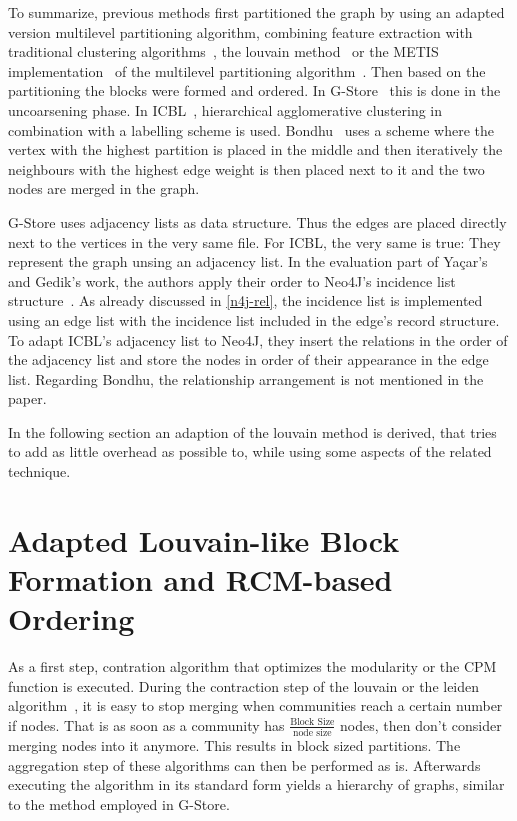      To summarize, previous methods first partitioned the graph by using an adapted version multilevel partitioning algorithm, combining feature extraction with traditional clustering algorithms~\autocite{overview_clust}, the louvain method~\autocite{blondel2008fast} or the METIS implementation~\autocite{karypis} of the multilevel partitioning algorithm~\autocite{hendrickson1995multi}.
    Then based on the partitioning the blocks were formed and ordered.
    In G-Store~\autocite{steinhaus2010g} this is done in the uncoarsening phase.
    In ICBL~\autocite{yacsar2017distributed, yacsar2015scalable}, hierarchical agglomerative clustering in combination with a labelling scheme is used.
    Bondhu~\autocite{hoque2012disk} uses a scheme where the vertex with the highest partition is placed in the middle and then iteratively the neighbours with the highest edge weight is then placed next to it and the two nodes are merged in the graph. 
    
    G-Store uses adjacency lists as data structure.
    Thus the edges are placed directly next to the vertices in the very same file.
    For ICBL, the very same is true:
    They represent the graph unsing an adjacency list. 
    In the evaluation part of Ya\c{c}ar's and Gedik's work, the authors apply their order to Neo4J's incidence list structure~\autocite{Rodriguez2010ConstructionsFD, robinson2015graph}. 
    As already discussed in \ref{n4j-rel}, the incidence list is implemented using an edge list with the incidence list included in the edge's record structure.
    To adapt ICBL's adjacency list to Neo4J, they insert the relations in the order of the adjacency list and store the nodes in order of their appearance in the edge list.    
    Regarding Bondhu, the relationship arrangement is not mentioned in the paper.
    
    In the following section an adaption of the louvain method is derived, that tries to add as little overhead as possible to, while using some aspects of the related technique.
    
\section{Adapted Louvain-like Block Formation and RCM-based Ordering}
        As a first step, contration algorithm that optimizes the modularity or the CPM~\autocite{traag2011narrow, potts1952some} function is executed.
        During the contraction step of the louvain or the leiden algorithm~\autocite{traag2019louvain}, it is easy to stop merging when communities reach a certain number if nodes.
        That is as soon as a community has $\frac{\text{Block Size}}{\text{node size}}$ nodes, then don't consider merging nodes into it anymore.
        This results in block sized partitions.
        The aggregation step of these algorithms can then be performed as is. 
        Afterwards executing the algorithm in its standard form yields a hierarchy of graphs, similar to the method employed in G-Store.
    
